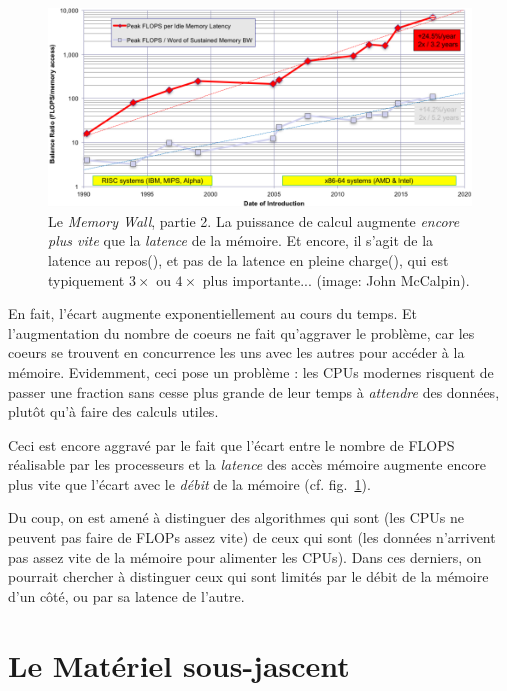 \begin{figure}
  \includegraphics[width=\textwidth]{calpin_wall_latence.png}
  \caption{Le \og \emph{Memory Wall}\fg, partie 2. La puissance de calcul
    augmente \emph{encore plus vite} que la \emph{latence} de la mémoire. Et
    encore, il s'agit de la latence \og au repos\fg (), et
    pas de la latence \og en pleine charge\fg (), qui
    est typiquement $3\times$ ou $4\times$ plus importante...  (image: John
    McCalpin). \label{fig:memwall_lat}}
\end{figure}


En fait, l'écart augmente exponentiellement au cours du temps. Et l'augmentation
du nombre de coeurs ne fait qu'aggraver le problème, car les coeurs se trouvent
en concurrence les uns avec les autres pour accéder à la mémoire. Evidemment,
ceci pose un problème : les CPUs modernes risquent de passer une fraction sans
cesse plus grande de leur temps à \emph{attendre} des données, plutôt qu'à faire
des calculs utiles.

Ceci est encore aggravé par le fait que l'écart entre le nombre de FLOPS
réalisable par les processeurs et la \emph{latence} des accès mémoire augmente
encore plus vite que l'écart avec le \emph{débit} de la mémoire
(cf. fig.~\ref{fig:memwall_lat}).

Du coup, on est amené à distinguer des algorithmes qui sont
 (les CPUs ne peuvent pas faire de FLOPs assez vite) de
ceux qui sont  (les données n'arrivent pas assez vite de
la mémoire pour alimenter les CPUs). Dans ces derniers, on pourrait chercher à
distinguer ceux qui sont limités par le débit de la mémoire d'un côté, ou par sa
latence de l'autre.

\section{Le Matériel sous-jascent}

